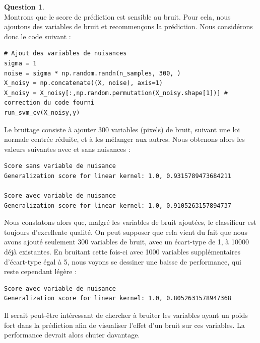 \documentclass[11pt,a4paper]{article}
\theoremstyle{definition}
\newtheorem{Qu}{Question}
\begin{document}
\begin{Qu}~\\

Montrons que le score de prédiction est sensible au bruit. Pour cela, nous ajoutons des variables de bruit et recommençons la prédiction. 
Nous considérons donc le code suivant : 

\begin{verbatim}
# Ajout des variables de nuisances
sigma = 1
noise = sigma * np.random.randn(n_samples, 300, )
X_noisy = np.concatenate((X, noise), axis=1)
X_noisy = X_noisy[:,np.random.permutation(X_noisy.shape[1])] # correction du code fourni
run_svm_cv(X_noisy,y)
\end{verbatim}

Le bruitage consiste à ajouter 300 variables (pixels) de bruit, suivant une loi normale centrée réduite, et à les mélanger aux autres. Nous obtenons alors les valeurs suivantes avec et sans nuisances :

\begin{verbatim}
Score sans variable de nuisance
Generalization score for linear kernel: 1.0, 0.9315789473684211

Score avec variable de nuisance
Generalization score for linear kernel: 1.0, 0.9105263157894737
\end{verbatim}


Nous constatons alors que, malgré les variables de bruit ajoutées, le classifieur est toujours d'excellente qualité. On peut supposer que cela vient du fait que nous avons ajouté seulement 300 variables de bruit, avec un écart-type de 1, à 10000 déjà existantes. 
En bruitant cette fois-ci avec 1000 variables supplémentaires d'écart-type égal à 5, nous voyons se dessiner une baisse de performance, qui reste cependant légère :

\begin{verbatim}
Score avec variable de nuisance
Generalization score for linear kernel: 1.0, 0.8052631578947368 
\end{verbatim}

Il serait peut-être intéressant de chercher à bruiter les variables ayant un poids fort dans la prédiction afin de visualiser l'effet d'un bruit sur ces variables. La performance devrait alors chuter davantage. 



\end{Qu}

\
\end{document}
